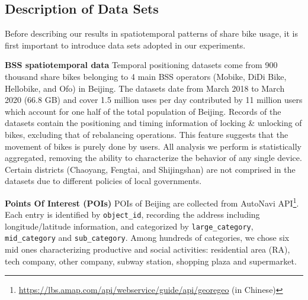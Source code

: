 \documentclass[ijgi,submit,moreauthors,pdftex]{Definitions/mdpi}
\begin{document}
\subsection{Description of Data Sets}
Before describing our results in spatiotemporal patterns of share bike usage, it is first important to introduce data sets adopted in our experiments.

\textbf{BSS spatiotemporal data} Temporal positioning datasets come from 900 thousand share bikes belonging to 4 main BSS operators (Mobike, DiDi Bike, Hellobike, and Ofo) in Beijing.
The datasets date from March 2018 to March 2020 (66.8 GB) and cover 1.5 million uses per day contributed by 11 million users which account for one half of the total population of Beijing.
Records of the datasets contain the positioning and timing information of locking \& unlocking of bikes, excluding that of rebalancing operations.
This feature suggests that the movement of bikes is purely done by users.
All analysis we perform is statistically aggregated, removing the ability to characterize the behavior of any single device.
Certain districts (Chaoyang, Fengtai, and Shijingshan) are not comprised in the datasets due to different policies of local governments.

\textbf{Points Of Interest (POIs)} POIs of Beijing are collected from AutoNavi API\footnote{\url{https://lbs.amap.com/api/webservice/guide/api/georegeo} (in Chinese)}.
Each entry is identified by \texttt{object\_id}, recording the address including longitude/latitude information, and categorized by \texttt{large\_category}, \texttt{mid\_category} and \texttt{sub\_category}.
Among hundreds of categories, we chose six mid ones characterizing productive and social activities: residential area (RA), tech company, other company, subway station, shopping plaza and supermarket.
\end{document}
